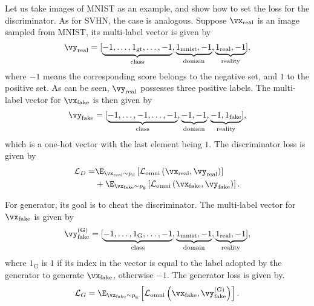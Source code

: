\documentclass[paper_2425.tex]{subfiles}
\begin{document}
Let us take images of MNIST as an example, and show how to set the loss for the discriminator. As for SVHN, the case is analogous. Suppose $\vx_{\text{real}}$ is an image sampled from MNIST, its multi-label vector is given by
\begin{equation}
  \vy_{\text{real}} = [\underbrace{-1, \dots, 1_{\text{gt}}, \dots, -1}_{\text{class}}, \underbrace{1_{\text{mnist}}, -1}_{\text{domain}}, \underbrace{1_{\text{real}}, -1}_{\text{reality}}],
  \label{apx:equ:oneside-multi_label_real}
\end{equation}
where $-1$ means the corresponding score belongs to the negative set, and $1$ to the positive set. As can be seen, $\vy_{\text{real}}$ possesses three positive labels. The multi-label vector for $\vx_{\text{fake}}$ is then given by
\begin{equation}
  \vy_{\text{fake}} = [\underbrace{-1, \dots, -1, \dots, -1}_{\text{class}}, \underbrace{-1, -1}_{\text{domain}}, \underbrace{-1, 1_{\text{fake}}}_{\text{reality}}],
  \label{apx:equ:oneside-multi_label_fake}
\end{equation}
which is a one-hot vector with the last element being $1$. The discriminator loss is given by
\begin{equation}
\begin{aligned}
    \mathcal{L}_{D}
    = & \E_{\vx_{\text{real}} \sim p_{\text{d}}} \left[\mathcal{L}_{\text {omni}}\left(\vx_{\text{real}}, \vy_{\text{real}}\right)\right]    \\
      & + \E_{\vx_{\text{fake}} \sim p_{\text{g}}} \left[\mathcal{L}_{\text {omni}}\left(\vx_{\text{fake}}, \vy_{\text{fake}}\right)\right].
  \end{aligned}
\label{apx:equ:D_loss}
\end{equation}

For generator, its goal is to cheat the discriminator. The multi-label vector for $\vx_{\text{fake}}$ is given by
\begin{equation}
  \vy_{\text{fake}}^{(\text{G})} = [\underbrace{-1, \dots, 1_{\text{G}}, \dots, -1}_{\text{class}}, \underbrace{1_{\text{mnist}}, -1}_{\text{domain}}, \underbrace{1_{\text{real}}, -1}_{\text{reality}}],
  \label{apx:equ:oneside-multi_label_G}
\end{equation}
where $1_{\text{G}}$ is $1$ if its index in the vector is equal to the label adopted by the generator to generate $\vx_{\text{fake}}$, otherwise $-1$. The generator loss is given by.
\begin{equation}
\begin{aligned}
    \mathcal{L}_{G}
    = \E_{\vx_{\text{fake}} \sim p_{\text{g}}} \left[\mathcal{L}_{\text {omni}}\left(\vx_{\text{fake}}, \vy_{\text{fake}}^{(\text{G})}\right)\right].
  \end{aligned}
\label{apx:equ:G_loss}
\end{equation}
\end{document}

